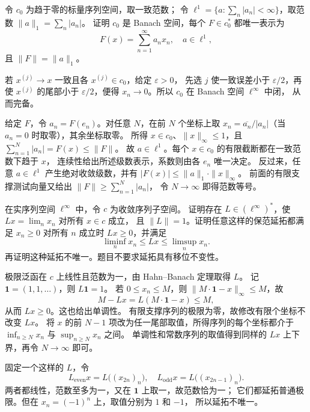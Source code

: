 \begin{exercise}\label{b1:ex:08-c0-dual}
令 \(c_0\) 为趋于零的标量序列空间，取一致范数；
令 \(\ell^1=\{a:\sum_n|a_n|<\infty\}\)，取范数 \(\|a\|_1=\sum_n|a_n|\)。
证明 \(c_0\) 是 Banach 空间，每个 \(F\in c_0^*\) 都唯一表示为
\[
 F(x)=\sum_{n=1}^\infty a_nx_n,\quad a\in\ell^1,
\]
且 \(\|F\|=\|a\|_1\)。
\end{exercise}
\begin{solution}
若 \(x^{(j)}\to x\) 一致且各 \(x^{(j)}\in c_0\)，给定 \(\varepsilon>0\)，
先选 \(j\) 使一致误差小于 \(\varepsilon/2\)，再使 \(x^{(j)}\) 的尾部小于%
\(\varepsilon/2\)，便得 \(x_n\to0\)。所以 \(c_0\) 在 Banach 空间 \(\ell^\infty\) 中闭，
从而完备。

给定 \(F\)，令 \(a_n=F(e_n)\)。对任意 \(N\)，在前 \(N\) 个坐标上取%
\(x_n=\overline{a_n}/|a_n|\)（当 \(a_n=0\) 时取零），其余坐标取零。
所得 \(x\in c_0\)、\(\|x\|_\infty\leq1\)，且%
\(\sum_{n=1}^N|a_n|=F(x)\leq\|F\|\)。
故 \(a\in\ell^1\)。每个 \(x\in c_0\) 的有限截断都在一致范数下趋于 \(x\)，
连续性给出所述级数表示，系数则由各 \(e_n\) 唯一决定。
反过来，任意 \(a\in\ell^1\) 产生绝对收敛级数，并有%
\(|F(x)|\leq\|a\|_1\cdot\|x\|_\infty\)。
前面的有限支撑测试向量又给出 \(\|F\|\geq\sum_{n=1}^N|a_n|\)，
令 \(N\to\infty\) 即得范数等号。
\end{solution}

\begin{exercise}\label{b1:ex:08-positive-limit}
在实序列空间 \(\ell^\infty\) 中，令 \(c\) 为收敛序列子空间。
证明存在 \(L\in(\ell^\infty)^*\)，使 \(Lx=\lim_nx_n\) 对所有 \(x\in c\) 成立，
且 \(\|L\|=1\)。证明任意这样的保范延拓都满足%
\(x_n\geq0\) 对所有 \(n\) 成立时 \(Lx\geq0\)，并满足
\[
 \liminf_nx_n\leq Lx\leq\limsup_nx_n.
\]
再证明这种延拓不唯一。题目不要求延拓具有移位不变性。
\end{exercise}
\begin{solution}
极限泛函在 \(c\) 上线性且范数为一，由 Hahn--Banach 定理取得 \(L\)。
记 \(\mathbf1=(1,1,\ldots)\)，则 \(L\mathbf1=1\)。
若 \(0\leq x_n\leq M\)，则 \(\|M\cdot \mathbf1-x\|_\infty\leq M\)，故
\[
 M-Lx=L(M\cdot \mathbf1-x)\leq M,
\]
从而 \(Lx\geq0\)。这也给出单调性。
有限支撑序列的极限为零，故修改有限个坐标不改变 \(Lx\)。
将 \(x\) 的前 \(N-1\) 项改为任一尾部取值，所得序列的每个坐标都介于%
\(\inf_{n\geq N}x_n\) 与 \(\sup_{n\geq N}x_n\) 之间。
单调性和常数序列的取值得到同样的 \(Lx\) 上下界，再令 \(N\to\infty\) 即可。

固定一个这样的 \(L\)，令
\[
 L_{\mathrm{even}}x=L\bigl((x_{2n})_n\bigr),\quad
 L_{\mathrm{odd}}x=L\bigl((x_{2n-1})_n\bigr).
\]
两者都线性，范数至多为一，又在 \(\mathbf1\) 上取一，故范数恰为一；
它们都延拓普通极限。但在 \(x_n=(-1)^n\) 上，取值分别为 \(1\) 和 \(-1\)，
所以延拓不唯一。
\end{solution}

